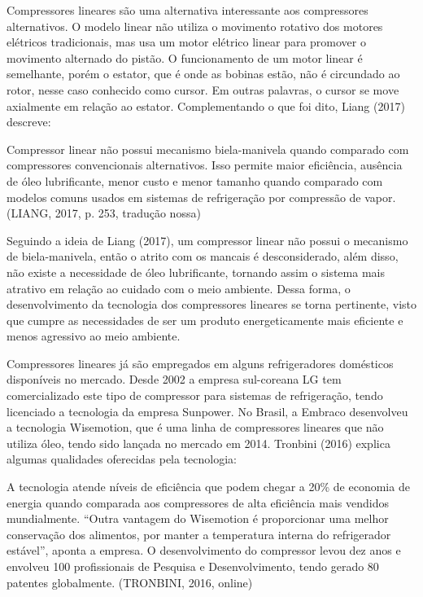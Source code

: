 Compressores lineares são uma alternativa interessante aos compressores alternativos. O modelo linear não utiliza o movimento rotativo dos motores elétricos tradicionais, mas usa um motor elétrico linear para promover o movimento alternado do pistão. O funcionamento de um motor linear é semelhante, porém o estator, que é onde as bobinas estão, não é circundado ao rotor, nesse caso conhecido como cursor. Em outras palavras, o cursor se move axialmente em relação ao estator. Complementando o que foi dito, Liang (2017) descreve:

\begin{citacao}
Compressor linear não possui mecanismo biela-manivela quando comparado com compressores convencionais alternativos. Isso permite maior eficiência,  ausência de óleo lubrificante, menor custo e menor tamanho quando comparado com modelos comuns usados em sistemas de refrigeração por compressão de vapor.(LIANG, 2017, p. 253, tradução nossa)
\end{citacao}

Seguindo a ideia de Liang (2017), um compressor linear não possui o mecanismo de biela-manivela, então o atrito com os mancais é desconsiderado, além disso, não existe a necessidade de óleo lubrificante, tornando assim o sistema mais atrativo em relação ao cuidado com o meio ambiente. Dessa forma, o desenvolvimento da tecnologia dos compressores lineares se torna pertinente, visto que cumpre as necessidades de ser um produto energeticamente mais eficiente e menos agressivo ao meio ambiente.

Compressores lineares já são empregados em alguns refrigeradores domésticos disponíveis no mercado. Desde 2002 a empresa sul-coreana LG tem comercializado este tipo de compressor para sistemas de refrigeração, tendo licenciado a tecnologia da empresa Sunpower. No Brasil, a Embraco desenvolveu a tecnologia Wisemotion, que é uma linha de compressores lineares que não utiliza óleo, tendo sido lançada no mercado em 2014. Tronbini (2016) explica algumas qualidades oferecidas pela tecnologia:

\begin{citacao}
A tecnologia atende níveis de eficiência que podem chegar a 20\% de economia de energia quando comparada aos compressores de alta eficiência mais vendidos mundialmente. “Outra vantagem do Wisemotion é proporcionar uma melhor conservação dos alimentos, por manter a temperatura interna do refrigerador estável”, aponta a empresa. O desenvolvimento do compressor levou dez anos e envolveu 100 profissionais de Pesquisa e Desenvolvimento, tendo gerado 80 patentes globalmente. (TRONBINI, 2016, online)
\end{citacao}

